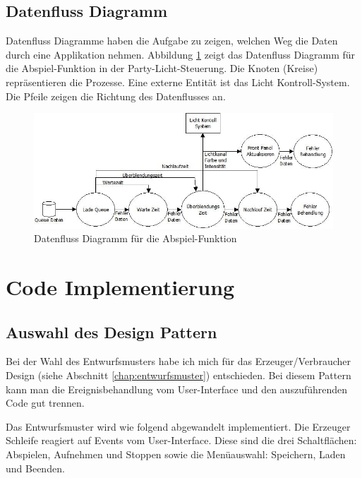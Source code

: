 \subsection{Datenfluss Diagramm}
Datenfluss Diagramme haben die Aufgabe zu zeigen, welchen Weg die Daten durch eine Applikation nehmen. Abbildung \ref{fig:plan02} zeigt das Datenfluss Diagramm für die Abspiel-Funktion in der Party-Licht-Steuerung. Die Knoten (Kreise) repräsentieren die Prozesse. Eine externe Entität ist das Licht Kontroll-System. Die Pfeile zeigen die Richtung des Datenflusses an.
	\begin{figure}[h!]
	\centering
		\includegraphics[width=\textwidth]{Pics/play-dataflow.jpeg}
	\caption{Datenfluss Diagramm für die Abspiel-Funktion}
	\label{fig:plan02}
	\end{figure}	
		

\section{Code Implementierung}
		\subsection{Auswahl des Design Pattern} %
		\label{chap:designpattern}
		Bei der Wahl des Entwurfsmusters habe ich mich für das Erzeuger/Verbraucher Design  (siehe Abschnitt \ref{chap:entwurfsmuster}) entschieden. Bei diesem Pattern kann man die Ereignisbehandlung vom User-Interface und den auszuführenden Code gut trennen. 

Das Entwurfsmuster wird wie folgend abgewandelt implementiert. Die Erzeuger Schleife reagiert auf Events vom User-Interface. Diese sind die drei Schaltflächen: Abspielen, Aufnehmen und Stoppen sowie die Menüauswahl: Speichern, Laden und Beenden.

